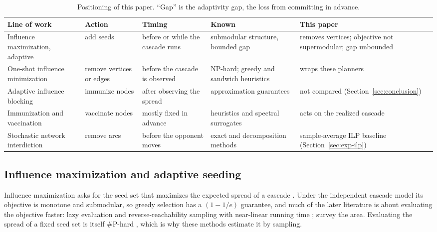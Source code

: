 \documentclass[11pt]{article}
\theoremstyle{definition}
\theoremstyle{remark}
\newcommand{\up}{\rule{0pt}{2.6ex}}
\begin{document}
\begin{table}[h]
\centering
\caption{Positioning of this paper. ``Gap'' is the adaptivity gap, the loss from committing in advance.}\label{tab:related}
\small
\begin{tabular}{@{}>{\raggedright\arraybackslash}p{}>{\raggedright\arraybackslash}p{}>{\raggedright\arraybackslash}p{}>{\raggedright\arraybackslash}p{}>{\raggedright\arraybackslash}p{}@{}}
\hline
\up Line of work & Action & Timing & Known & This paper \\
\hline
\up Influence maximization, adaptive & add seeds & before or while the cascade runs & submodular structure, bounded gap & removes vertices; objective not supermodular; gap unbounded \\
One-shot influence minimization & remove vertices or edges & before the cascade is observed & NP-hard; greedy and sandwich heuristics & wraps these planners \\
Adaptive influence blocking & immunize nodes & after observing the spread & approximation guarantees \citep{shi2019} & not compared (Section~\ref{sec:conclusion}) \\
Immunization and vaccination & vaccinate nodes & mostly fixed in advance & heuristics and spectral surrogates & acts on the realized cascade \\
Stochastic network interdiction & remove arcs & before the opponent moves & exact and decomposition methods & sample-average ILP baseline (Section~\ref{sec:exp-ilp}) \\
\hline
\end{tabular}
\end{table}

\subsection{Influence maximization and adaptive seeding}

Influence maximization asks for the seed set that maximizes the expected spread of a cascade \citep{kempe2003}. Under the independent cascade model its objective is monotone and submodular, so greedy selection has a $(1-1/e)$ guarantee, and much of the later literature is about evaluating the objective faster: lazy evaluation \citep{leskovec2007b} and reverse-reachability sampling with near-linear running time \citep{borgs2014,tang2014}; \citet{li2018} survey the area. Evaluating the spread of a fixed seed set is itself \#P-hard \citep{chen2010}, which is why these methods estimate it by sampling.
\end{document}
